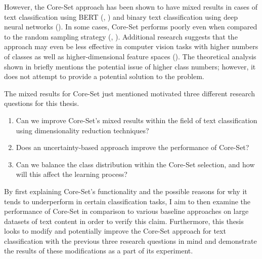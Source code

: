 \documentclass[english,bachelor,ul]{webisthesis} %
\begin{document}
However, the Core-Set approach has been shown to have mixed results in cases of text classification using BERT (\cite{DBLP:conf/kdd/0002MM21}, \cite{DBLP:conf/emnlp/Ein-DorHGSDCDAK20}) and binary text classification using deep neural networks (\cite{DBLP:conf/cikm/Liu0LZW21}). In some cases, Core-Set performs poorly even when compared to the random sampling strategy (\cite{DBLP:conf/kdd/0002MM21}, \cite{DBLP:conf/aaai/ColemanCKCBBNSZ22}). Additional research suggests that the approach may even be less effective in computer vision tasks with higher numbers of classes as well as higher-dimensional feature spaces (\cite{DBLP:conf/iccv/SinhaED19}). The theoretical analysis shown in \cite{DBLP:conf/iclr/SenerS18} briefly mentions the potential issue of higher class numbers; however, it does not attempt to provide a potential solution to the problem.

The mixed results for Core-Set just mentioned motivated three different research questions for this thesis.

\begin{enumerate}
    \item Can we improve Core-Set's mixed results within the field of text classification using dimensionality reduction techniques?
    \item Does an uncertainty-based approach improve the performance of Core-Set?
    \item Can we balance the class distribution within the Core-Set selection, and how will this affect the learning process?
\end{enumerate}



By first explaining Core-Set's functionality and the possible reasons for why it tends to underperform in certain classification tasks, I aim to then examine the performance of Core-Set in comparison to various baseline approaches on large datasets of text content in order to verify this claim. Furthermore, this thesis looks to modify and potentially improve the Core-Set approach for text classification with the previous three research questions in mind and demonstrate the results of these modifications as a part of its experiment.
\end{document}
